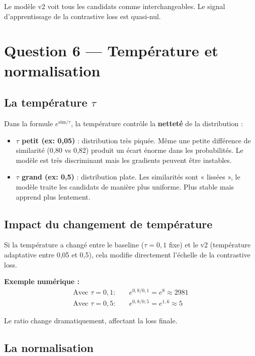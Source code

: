 \documentclass[11pt,a4paper]{article}
\begin{document}
Le modèle v2 voit tous les candidats comme interchangeables. Le signal d'apprentissage de la contrastive loss est quasi-nul.

\section{Question 6 — Température et normalisation}

\subsection{La température $\tau$}

Dans la formule $e^{\text{sim}/\tau}$, la température contrôle la \textbf{netteté} de la distribution :

\begin{itemize}
    \item \textbf{$\tau$ petit (ex: 0{,}05)} : distribution très piquée. Même une petite différence de similarité (0{,}80 vs 0{,}82) produit un écart énorme dans les probabilités. Le modèle est très discriminant mais les gradients peuvent être instables.
    \item \textbf{$\tau$ grand (ex: 0{,}5)} : distribution plate. Les similarités sont « lissées », le modèle traite les candidats de manière plus uniforme. Plus stable mais apprend plus lentement.
\end{itemize}

\subsection{Impact du changement de température}

Si la température a changé entre le baseline ($\tau = 0{,}1$ fixe) et le v2 (température adaptative entre 0{,}05 et 0{,}5), cela modifie directement l'échelle de la contrastive loss.

\textbf{Exemple numérique :}
\begin{align}
\text{Avec } \tau = 0{,}1 : \quad & e^{0{,}8/0{,}1} = e^{8} \approx 2981 \\
\text{Avec } \tau = 0{,}5 : \quad & e^{0{,}8/0{,}5} = e^{1{,}6} \approx 5
\end{align}

Le ratio change dramatiquement, affectant la loss finale.

\subsection{La normalisation}
\end{document}
